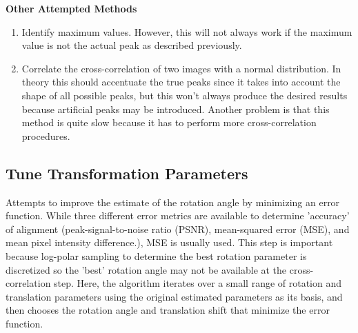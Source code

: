 \documentclass{article}
\begin{document}
\textbf{Other Attempted Methods}
\begin{enumerate}
\item Identify maximum values. However, this will not always work if the maximum value is not the actual peak as described previously. 
\item Correlate the cross-correlation of two images with a normal distribution. In theory this should accentuate the true peaks since it takes into account the shape of all possible peaks, but this won't always produce the desired results because artificial peaks may be introduced. Another problem is that this method is quite slow because it has to perform more cross-correlation procedures. 
\end{enumerate}

\subsection{Tune Transformation Parameters}
Attempts to improve the estimate of the rotation angle by minimizing an error function. While three different error metrics are available to determine 'accuracy' of alignment (peak-signal-to-noise ratio (PSNR), mean-squared error (MSE), and mean pixel intensity difference.), MSE is usually used. This step is important because log-polar sampling to determine the best rotation parameter is discretized so the 'best' rotation angle may not be available at the cross-correlation step. Here, the algorithm iterates over a small range of rotation and translation parameters using the original estimated parameters as its basis, and then chooses the rotation angle and translation shift that minimize the error function.
\end{document}

